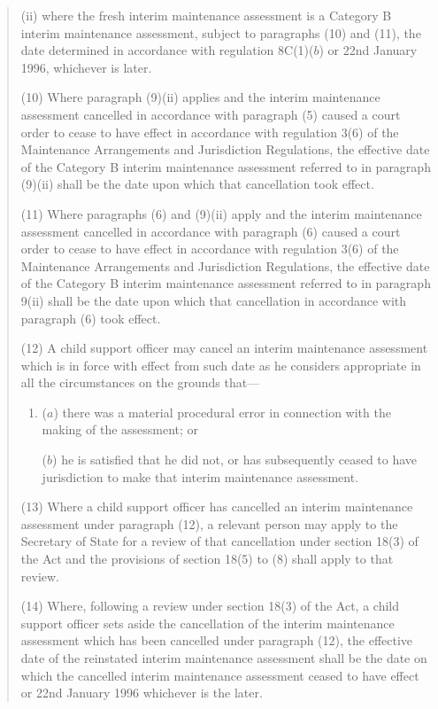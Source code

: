 \documentclass[a4paper]{article}
\begin{document}
\begin{quotation}
\begin{enumerate}
(ii) where the fresh interim maintenance assessment is a Category B interim maintenance assessment, subject to paragraphs (10) and (11), the date determined in accordance with regulation 8C(1)($b$) or 22nd January 1996, whichever is later.
\end{enumerate}

(10) Where paragraph (9)(ii) applies and the interim maintenance assessment cancelled in accordance with paragraph (5) caused a court order to cease to have effect in accordance with regulation 3(6) of the Maintenance Arrangements and Jurisdiction Regulations, the effective date of the Category B interim maintenance assessment referred to in paragraph (9)(ii) shall be the date upon which that cancellation took effect.

(11) Where paragraphs (6) and (9)(ii) apply and the interim maintenance assessment cancelled in accordance with paragraph (6) caused a court order to cease to have effect in accordance with regulation 3(6) of the Maintenance Arrangements and Jurisdiction Regulations, the effective date of the Category B interim maintenance assessment referred to in paragraph 9(ii) shall be the date upon which that cancellation in accordance with paragraph (6) took effect.

(12) A child support officer may cancel an interim maintenance assessment which is in force with effect from such date as he considers appropriate in all the circumstances on the grounds that—
\begin{enumerate}\item[]
($a$) there was a material procedural error in connection with the making of the assessment; or

($b$) he is satisfied that he did not, or has subsequently ceased to have jurisdiction to make that interim maintenance assessment.
\end{enumerate}

(13) Where a child support officer has cancelled an interim maintenance assessment under paragraph (12), a relevant person may apply to the Secretary of State for a review of that cancellation under section 18(3) of the Act and the provisions of section 18(5) to (8) shall apply to that review.

(14) Where, following a review under section 18(3) of the Act, a child support officer sets aside the cancellation of the interim maintenance assessment which has been cancelled under paragraph (12), the effective date of the reinstated interim maintenance assessment shall be the date on which the cancelled interim maintenance assessment ceased to have effect or 22nd January 1996 whichever is the later.


\end{quotation}
\end{document}
